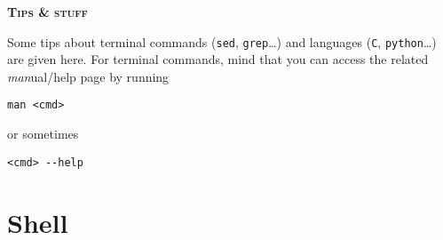 \documentclass[a4paper,12pt,%
              final%
              ]{article}
\begin{document}
\begin{center}
\bfseries \scshape \Huge \color{BlueX}%
Tips \& stuff
\end{center}
%
\vspace*{\baselineskip}

Some tips about terminal commands (\texttt{sed}, \texttt{grep}\ldots) and languages (\texttt{C}, \texttt{python}\ldots) are given here. For terminal commands, mind that you can access the related \emph{man}ual/help page by running
\begin{verbatim}
man <cmd>
\end{verbatim}
or sometimes
\begin{verbatim}
<cmd> --help
\end{verbatim}

\section{Shell}
\label{sec:shell}
\end{document}
